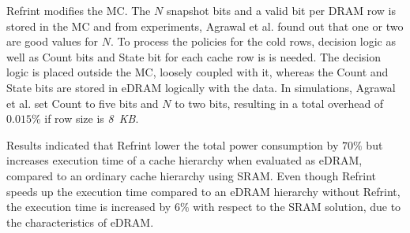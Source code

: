 Refrint modifies the MC. The $N$ snapshot bits and a valid bit per DRAM row is stored in the MC and from experiments, Agrawal et al. found out that one or two are good values for $N$. To process the policies for the cold rows, decision logic as well as Count bits and State bit for each cache row is is needed. The decision logic is placed outside the MC, loosely coupled with it, whereas the Count and State bits are stored in eDRAM logically with the data. In simulations, Agrawal et al. set Count to five bits and $N$ to two bits, resulting in a total overhead of $0.015\%$ if row size is \textit{8~KB}.

Results indicated that Refrint lower the total power consumption by $70\%$ but increases execution time of a cache hierarchy when evaluated as eDRAM, compared to an ordinary cache hierarchy using SRAM. Even though Refrint speeds up the execution time compared to an eDRAM hierarchy without Refrint, the execution time is increased by $6\%$  with respect to the SRAM solution, due to the characteristics of eDRAM.